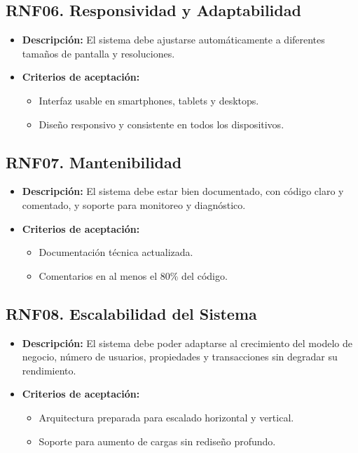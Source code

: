 	\subsection*{RNF06. Responsividad y Adaptabilidad}
		\begin{itemize}
			\item \textbf{Descripción:} El sistema debe ajustarse automáticamente a diferentes tamaños de pantalla y resoluciones.
			\item \textbf{Criterios de aceptación:}
			\begin{itemize}
				\item Interfaz usable en smartphones, tablets y desktops.
				\item Diseño responsivo y consistente en todos los dispositivos.
			\end{itemize}
		\end{itemize}
	
	\subsection*{RNF07. Mantenibilidad}
		\begin{itemize}
			\item \textbf{Descripción:} El sistema debe estar bien documentado, con código claro y comentado, y soporte para monitoreo y diagnóstico.
			\item \textbf{Criterios de aceptación:}
			\begin{itemize}
				\item Documentación técnica actualizada.
				\item Comentarios en al menos el 80\% del código.
			\end{itemize}
		\end{itemize}
		
	\subsection*{RNF08. Escalabilidad del Sistema}
		\begin{itemize}
			\item \textbf{Descripción:} El sistema debe poder adaptarse al crecimiento del modelo de negocio, número de usuarios, propiedades y transacciones sin degradar su rendimiento.
			\item \textbf{Criterios de aceptación:}
			\begin{itemize}
				\item Arquitectura preparada para escalado horizontal y vertical.
				\item Soporte para aumento de cargas sin rediseño profundo.
			\end{itemize}
		\end{itemize}
	
